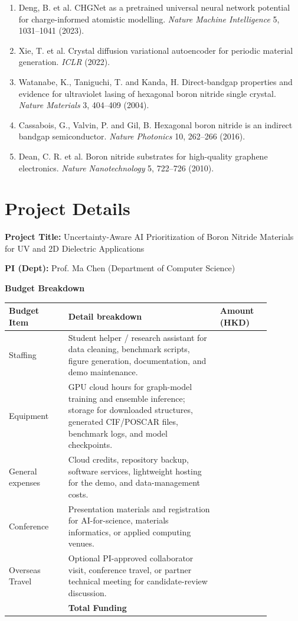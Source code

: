 \documentclass[10pt]{article}
\newcommand{\blank}[1][8em]{\colorbox{yellow!35}{\rule{0pt}{1.1em}\hspace{#1}}}
\begin{document}
\begin{enumerate}[leftmargin=1.2em,itemsep=1pt]
  \item Deng, B. et al. CHGNet as a pretrained universal neural network potential for charge-informed atomistic modelling. \textit{Nature Machine Intelligence} 5, 1031--1041 (2023).
  \item Xie, T. et al. Crystal diffusion variational autoencoder for periodic material generation. \textit{ICLR} (2022).
  \item Watanabe, K., Taniguchi, T. and Kanda, H. Direct-bandgap properties and evidence for ultraviolet lasing of hexagonal boron nitride single crystal. \textit{Nature Materials} 3, 404--409 (2004).
  \item Cassabois, G., Valvin, P. and Gil, B. Hexagonal boron nitride is an indirect bandgap semiconductor. \textit{Nature Photonics} 10, 262--266 (2016).
  \item Dean, C. R. et al. Boron nitride substrates for high-quality graphene electronics. \textit{Nature Nanotechnology} 5, 722--726 (2010).
\end{enumerate}
\normalsize

\section*{Project Details}
\textbf{Project Title:} Uncertainty-Aware AI Prioritization of Boron Nitride Materials for UV and 2D Dielectric Applications

\textbf{PI (Dept):} Prof. Ma Chen (Department of Computer Science)

\textbf{Budget Breakdown}
\begin{center}
\small
\begin{tabular}{>{\raggedright\arraybackslash}p{0.20\linewidth}>{\raggedright\arraybackslash}p{0.51\linewidth}>{\raggedright\arraybackslash}p{0.17\linewidth}}
\toprule
\textbf{Budget Item} & \textbf{Detail breakdown} & \textbf{Amount (HKD)} \\
\midrule
Staffing & Student helper / research assistant for data cleaning, benchmark scripts, figure generation, documentation, and demo maintenance. & \blank \\
Equipment & GPU cloud hours for graph-model training and ensemble inference; storage for downloaded structures, generated CIF/POSCAR files, benchmark logs, and model checkpoints. & \blank \\
General expenses & Cloud credits, repository backup, software services, lightweight hosting for the demo, and data-management costs. & \blank \\
Conference & Presentation materials and registration for AI-for-science, materials informatics, or applied computing venues. & \blank \\
Overseas Travel & Optional PI-approved collaborator visit, conference travel, or partner technical meeting for candidate-review discussion. & \blank \\
\midrule
 & \textbf{Total Funding} & \blank \\
\bottomrule
\end{tabular}
\end{center}
\end{document}
